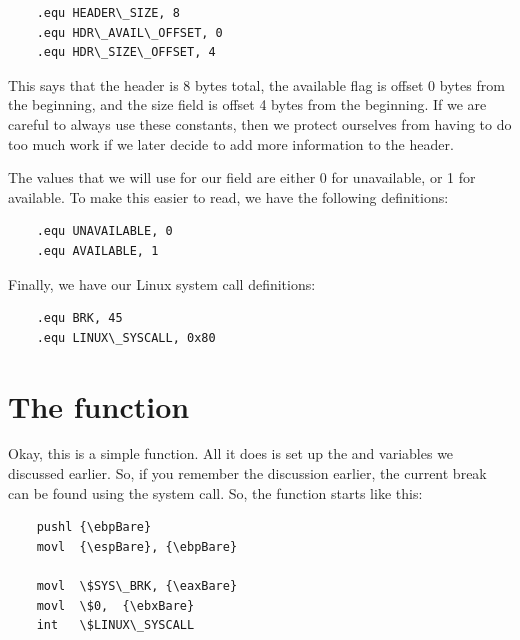 \begin{simpletyping}
\begin{lstlisting}
	.equ HEADER\_SIZE, 8
	.equ HDR\_AVAIL\_OFFSET, 0
	.equ HDR\_SIZE\_OFFSET, 4
\end{lstlisting}
\end{simpletyping}

This says that the header is 8 bytes total, the available flag is offset 0 bytes from the 
beginning, and the size field is offset 4 bytes from the 
beginning.  If we are careful to always use these constants,
then we protect ourselves from having to do too much work if we later decide to add more
information to the header.

The values that we will use for our  field are either 0 for
unavailable, or 1 for available.  To make this easier to read, we have the following definitions:

\begin{simpletyping}
\begin{lstlisting}
	.equ UNAVAILABLE, 0
	.equ AVAILABLE, 1
\end{lstlisting}
\end{simpletyping}

Finally, we have our Linux system call definitions:

\begin{simpletyping}
\begin{lstlisting}
	.equ BRK, 45
	.equ LINUX\_SYSCALL, 0x80
\end{lstlisting}
\end{simpletyping}

\section{The  function}

Okay, this is a simple function.  All it does is set up the  and
 variables we discussed earlier.  So, if you remember the
discussion earlier, the current break can be found using the 
 system call.  
So, the function starts like this:

\begin{simpletyping}
\begin{lstlisting}
	pushl {\ebpBare}
	movl  {\espBare}, {\ebpBare}

	movl  \$SYS\_BRK, {\eaxBare}
	movl  \$0,  {\ebxBare}
	int   \$LINUX\_SYSCALL
\end{lstlisting}
\end{simpletyping}

